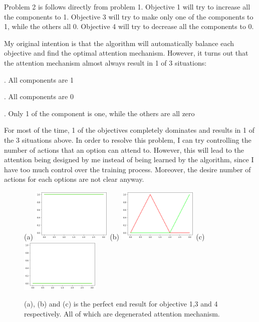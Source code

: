 \documentclass{article}
\begin{document}
	\quad Problem 2 is follows directly from problem 1. Objective 1 will try to increase all the components to 1. Objective 3 will try to make only one of the components to 1, while the others all 0. Objective 4 will try to decrease all the components to 0.
	
	\quad My original intention is that the algorithm will automatically balance each objective and find the optimal attention mechanism. However, it turns out that the attention mechanism almost always result in 1 of 3 situations:
	
	. All components are 1
	
	. All components are 0
	
	. Only 1 of the component is one, while the others are all zero
	
	\quad For most of the time, 1 of the objectives completely dominates and results in 1 of the 3 situations above. In order to resolve this problem, I can try controlling the number of actions that an option can attend to. However, this will lead to the attention being designed by me instead of being learned by the algorithm, since I have too much control over the training process. Moreover, the desire number of actions for each options are not clear anyway. 
	\begin{figure}[h]
		\centering
		\small{(a)}
		\includegraphics[width=1.5in]{all1s.png}
		\hspace{0.2in}
		\small{(b)}
		\includegraphics[width=1.5in]{entropyMin.png}
		\hspace{0.2in}
		\small{(c)}
		\includegraphics[width=1.5in]{all0s.png}
		\caption{(a), (b) and (c) is the perfect end result for objective 1,3 and 4 respectively. All of which are degenerated attention mechanism.}
	\end{figure}
\end{document}
